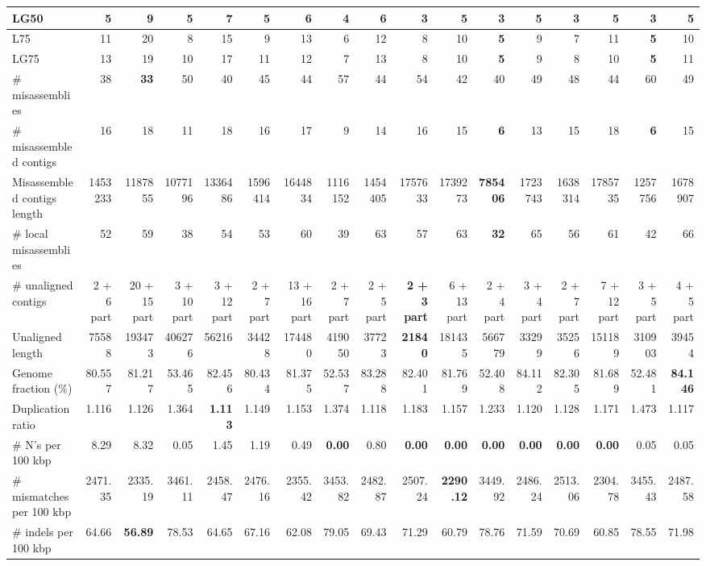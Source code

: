 \documentclass[12pt,a4paper]{article}
\begin{document}
\begin{table}[ht]
\begin{center}
\begin{tabular}{|l*{16}{|r}|}
LG50 & 5 & 9 & 5 & 7 & 5 & 6 & 4 & 6 & {\bf 3} & 5 & {\bf 3} & 5 & {\bf 3} & 5 & {\bf 3} & 5 \\ \hline
L75 & 11 & 20 & 8 & 15 & 9 & 13 & 6 & 12 & 8 & 10 & {\bf 5} & 9 & 7 & 11 & {\bf 5} & 10 \\ \hline
LG75 & 13 & 19 & 10 & 17 & 11 & 12 & 7 & 13 & 8 & 10 & {\bf 5} & 9 & 8 & 10 & {\bf 5} & 11 \\ \hline
\# misassemblies & 38 & {\bf 33} & 50 & 40 & 45 & 44 & 57 & 44 & 54 & 42 & 40 & 49 & 48 & 44 & 60 & 49 \\ \hline
\# misassembled contigs & 16 & 18 & 11 & 18 & 16 & 17 & 9 & 14 & 16 & 15 & {\bf 6} & 13 & 15 & 18 & {\bf 6} & 15 \\ \hline
Misassembled contigs length & 1453233 & 1187855 & 1077196 & 1336486 & 1596414 & 1644834 & 1116152 & 1454405 & 1757633 & 1739273 & {\bf 785406} & 1723743 & 1638314 & 1785735 & 1257756 & 1678907 \\ \hline
\# local misassemblies & 52 & 59 & 38 & 54 & 53 & 60 & 39 & 63 & 57 & 63 & {\bf 32} & 65 & 56 & 61 & 42 & 66 \\ \hline
\# unaligned contigs & 2 + 6 part & 20 + 15 part & 3 + 10 part & 3 + 12 part & 2 + 7 part & 13 + 16 part & 2 + 7 part & 2 + 5 part & {\bf 2 + 3 part} & 6 + 13 part & 2 + 4 part & 3 + 4 part & 2 + 7 part & 7 + 12 part & 3 + 5 part & 4 + 5 part \\ \hline
Unaligned length & 75588 & 193473 & 406276 & 56216 & 34428 & 174480 & 419050 & 37723 & {\bf 21840} & 181435 & 566779 & 33299 & 35256 & 151189 & 310903 & 39454 \\ \hline
Genome fraction (\%) & 80.557 & 81.217 & 53.465 & 82.456 & 80.434 & 81.375 & 52.537 & 83.288 & 82.401 & 81.769 & 52.408 & 84.112 & 82.305 & 81.689 & 52.481 & {\bf 84.146} \\ \hline
Duplication ratio & 1.116 & 1.126 & 1.364 & {\bf 1.113} & 1.149 & 1.153 & 1.374 & 1.118 & 1.183 & 1.157 & 1.233 & 1.120 & 1.128 & 1.171 & 1.473 & 1.117 \\ \hline
\# N's per 100 kbp & 8.29 & 8.32 & 0.05 & 1.45 & 1.19 & 0.49 & {\bf 0.00} & 0.80 & {\bf 0.00} & {\bf 0.00} & {\bf 0.00} & {\bf 0.00} & {\bf 0.00} & {\bf 0.00} & 0.05 & 0.05 \\ \hline
\# mismatches per 100 kbp & 2471.35 & 2335.19 & 3461.11 & 2458.47 & 2476.16 & 2355.42 & 3453.82 & 2482.87 & 2507.24 & {\bf 2290.12} & 3449.92 & 2486.24 & 2513.06 & 2304.78 & 3455.43 & 2487.58 \\ \hline
\# indels per 100 kbp & 64.66 & {\bf 56.89} & 78.53 & 64.65 & 67.16 & 62.08 & 79.05 & 69.43 & 71.29 & 60.79 & 78.76 & 71.59 & 70.69 & 60.85 & 78.55 & 71.98 \\ \hline

\end{tabular}
\end{center}
\end{table}
\end{document}
